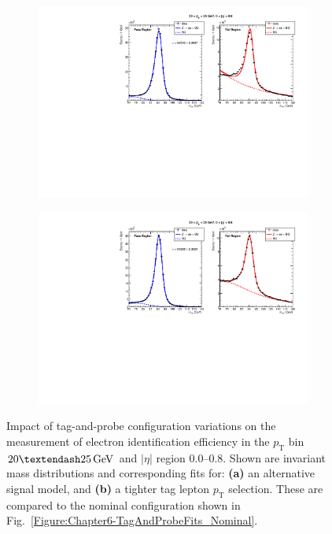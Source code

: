 \begin{figure}[h]
        \centering
        \begin{subfigure}[b]{\textwidth}
            \centering
            \includegraphics[width=\textwidth]{Figures/Chapter6/data_id_pt_20_to_25_eta_0.0_to_0.8_tpzee_signal.pdf}
            \caption{}
        \end{subfigure}
        \vspace{0.5cm}
        \begin{subfigure}[b]{\textwidth}
            \centering
            \includegraphics[width=\textwidth]{Figures/Chapter6/data_id_pt_20_to_25_eta_0.0_to_0.8_tpzee_tightTag.pdf}
            \caption{}
        \end{subfigure}
    \caption[Impact of tag-and-probe configuration variations on efficiency extraction.]{Impact of tag-and-probe configuration variations on the measurement of electron identification efficiency in the $p_{\mathrm{T}}$ bin $20–25\GeV$ and $|\eta|$ region 0.0–0.8. Shown are invariant mass distributions and corresponding fits for: \textbf{(a)} an alternative signal model, and \textbf{(b)} a tighter tag lepton $p_\text{T}$ selection. These are compared to the nominal configuration shown in Fig.~\ref{Figure:Chapter6-TagAndProbeFits_Nominal}.}
    \label{Figure:Chapter6-TagAndProbeFits_Alternative}
\end{figure}

